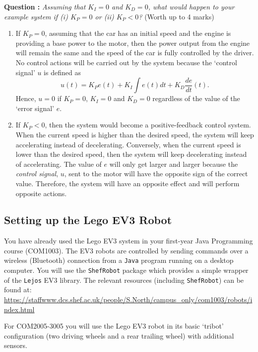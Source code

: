 \documentclass[hidelinks,a4paper,11pt]{article}
\newcounter{question}
\newcommand\myq{\refstepcounter{question}\thequestion}
\begin{document}
{\bfseries Question \myq:}  \emph{Assuming that $K_I=0$ and $K_D=0$, what would happen to your
example system if (i) $K_P=0$ or (ii) $K_P<0$?} (Worth up to 4 marks)\\
\begin{mdframed}
\begin{enumerate}[label=(\roman*)]
  \item If $K_P=0$, assuming that the car has an initial speed and the engine is providing a base
  power to the motor, then the power output from the engine will remain the same and the speed of
  the car is fully controlled by the driver. No control actions will be carried out by the system
  because the `control signal' $u$ is defined as $$u(t) = K_P e(t) + K_I \int e(t)dt + K_D
  \frac{de}{dt}(t) .$$ Hence, $u=0$ if $K_P=0$, $K_I=0$ and $K_D=0$ regardless of the value of the
  `error signal' $e$.
  \item If $K_P<0$, then the system would become a positive-feedback control system. When the
  current speed is higher than the desired speed, the system will keep accelerating instead of
  decelerating. Conversely, when the current speed is lower than the desired speed, then the system
  will keep decelerating instead of accelerating. The value of $e$ will only get larger and larger
  because the \emph{control signal}, $u$, sent to the motor will have the opposite sign of the
  correct value. Therefore, the system will have an opposite effect and will perform opposite
  actions.
\end{enumerate}
\end{mdframed}
\vspace*{\baselineskip}


\subsection{Setting up the Lego EV3 Robot}

You have already used the Lego EV3 system in your first-year Java Programming course (COM1003).  The
EV3 robots are controlled by sending commands over a wireless (Bluetooth) connection from a
\texttt{Java} program running on a desktop computer.  You will use the \texttt{ShefRobot} package
which provides a simple wrapper of the \texttt{Lejos} EV3 library.  The relevant resources
(including \texttt{ShefRobot}) can be found at:
\url{https://staffwww.dcs.shef.ac.uk/people/S.North/campus_only/com1003/robots/index.html}

For COM2005-3005 you will use the Lego EV3 robot in its basic `tribot' configuration (two driving
wheels and a rear trailing wheel) with additional sensors.
\end{document}
